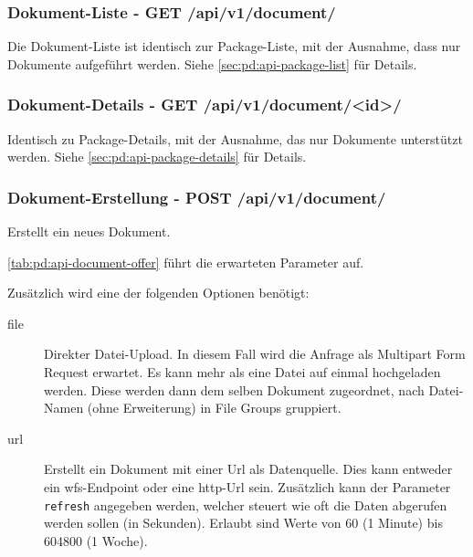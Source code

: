 \subsubsection{Dokument-Liste - GET /api/v1/document/}
Die Dokument-Liste ist identisch zur Package-Liste, mit der Ausnahme, dass nur Dokumente aufgeführt werden. Siehe \cref{sec:pd:api-package-list} für Details.

\subsubsection{Dokument-Details - GET /api/v1/document/<id>/} \label{sec:pd:api-document-details}
Identisch zu Package-Details, mit der Ausnahme, das nur Dokumente unterstützt werden. Siehe \cref{sec:pd:api-package-details} für Details.

\subsubsection{Dokument-Erstellung - POST /api/v1/document/}
Erstellt ein neues Dokument. 

\cref{tab:pd:api-document-offer} führt die erwarteten Parameter auf.

Zusätzlich wird eine der folgenden Optionen benötigt:
\begin{description}
\item[file] Direkter Datei-Upload. In diesem Fall wird die Anfrage als Multipart Form Request erwartet. Es kann mehr als eine Datei auf einmal hochgeladen werden. Diese werden dann dem selben Dokument zugeordnet, nach Datei-Namen (ohne Erweiterung) in File Groups gruppiert.
\item[url] Erstellt ein Dokument mit einer Url als Datenquelle. Dies kann entweder ein \gls{wfs}-Endpoint oder eine http-Url sein. Zusätzlich kann der Parameter \texttt{refresh} angegeben werden, welcher steuert wie oft die Daten abgerufen werden sollen (in Sekunden). Erlaubt sind Werte von 60 (1 Minute) bis 604800 (1 Woche).
\end{description}

